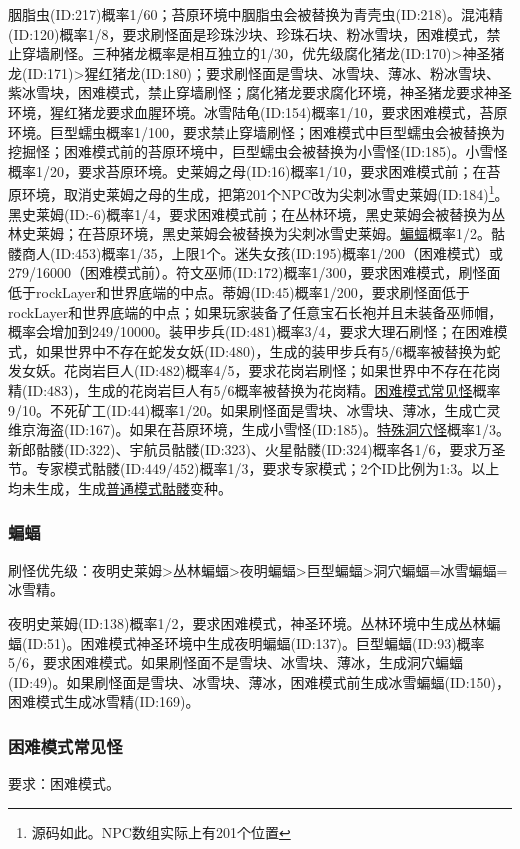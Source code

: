 胭脂虫(ID:217)概率1/60；苔原环境中胭脂虫会被替换为青壳虫(ID:218)。混沌精(ID:120)概率1/8，要求刷怪面是珍珠沙块、珍珠石块、粉冰雪块，困难模式，禁止穿墙刷怪。三种猪龙概率是相互独立的1/30，优先级腐化猪龙(ID:170)>神圣猪龙(ID:171)>猩红猪龙(ID:180)；要求刷怪面是雪块、冰雪块、薄冰、粉冰雪块、紫冰雪块，困难模式，禁止穿墙刷怪；腐化猪龙要求腐化环境，神圣猪龙要求神圣环境，猩红猪龙要求血腥环境。冰雪陆龟(ID:154)概率1/10，要求困难模式，苔原环境。巨型蠕虫概率1/100，要求禁止穿墙刷怪；困难模式中巨型蠕虫会被替换为挖掘怪；困难模式前的苔原环境中，巨型蠕虫会被替换为小雪怪(ID:185)。小雪怪概率1/20，要求苔原环境。史莱姆之母(ID:16)概率1/10，要求困难模式前；在苔原环境，取消史莱姆之母的生成，把第201个NPC改为尖刺冰雪史莱姆(ID:184)\footnote{源码如此。NPC数组实际上有201个位置}。黑史莱姆(ID:-6)概率1/4，要求困难模式前；在丛林环境，黑史莱姆会被替换为丛林史莱姆；在苔原环境，黑史莱姆会被替换为尖刺冰雪史莱姆。\hyperref[app18]{蝙蝠}概率1/2。骷髅商人(ID:453)概率1/35，上限1个。迷失女孩(ID:195)概率1/200（困难模式）或279/16000（困难模式前）。符文巫师(ID:172)概率1/300，要求困难模式，刷怪面低于rockLayer和世界底端的中点。蒂姆(ID:45)概率1/200，要求刷怪面低于rockLayer和世界底端的中点；如果玩家装备了任意宝石长袍并且未装备巫师帽，概率会增加到249/10000。装甲步兵(ID:481)概率3/4，要求大理石刷怪；在困难模式，如果世界中不存在蛇发女妖(ID:480)，生成的装甲步兵有5/6概率被替换为蛇发女妖。花岗岩巨人(ID:482)概率4/5，要求花岗岩刷怪；如果世界中不存在花岗精(ID:483)，生成的花岗岩巨人有5/6概率被替换为花岗精。\hyperref[app19]{困难模式常见怪}概率9/10。不死矿工(ID:44)概率1/20。如果刷怪面是雪块、冰雪块、薄冰，生成亡灵维京海盗(ID:167)。如果在苔原环境，生成小雪怪(ID:185)。\hyperref[app20]{特殊洞穴怪}概率1/3。新郎骷髅(ID:322)、宇航员骷髅(ID:323)、火星骷髅(ID:324)概率各1/6，要求万圣节。专家模式骷髅(ID:449/452)概率1/3，要求专家模式；2个ID比例为1:3。以上均未生成，生成\hyperref[app21]{普通模式骷髅}变种。

\subsubsection{蝙蝠}\label{app18}
刷怪优先级：夜明史莱姆>丛林蝙蝠>夜明蝙蝠>巨型蝙蝠>洞穴蝙蝠=冰雪蝙蝠=冰雪精。

夜明史莱姆(ID:138)概率1/2，要求困难模式，神圣环境。丛林环境中生成丛林蝙蝠(ID:51)。困难模式神圣环境中生成夜明蝙蝠(ID:137)。巨型蝙蝠(ID:93)概率5/6，要求困难模式。如果刷怪面不是雪块、冰雪块、薄冰，生成洞穴蝙蝠(ID:49)。如果刷怪面是雪块、冰雪块、薄冰，困难模式前生成冰雪蝙蝠(ID:150)，困难模式生成冰雪精(ID:169)。

\subsubsection{困难模式常见怪}\label{app19}
要求：困难模式。

